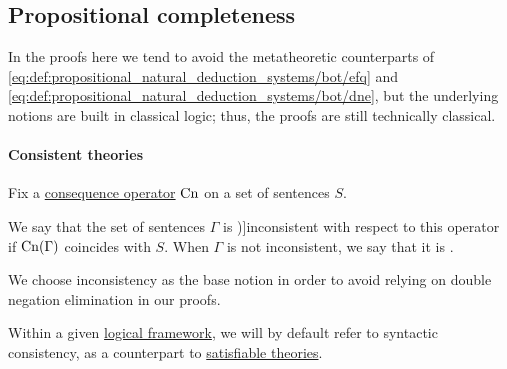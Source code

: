 \subsection{Propositional completeness}\label{subsec:propositional_completeness}

\begin{remark}\label{rem:classical_metatheoretic_proofs}
  In the proofs here we tend to avoid the metatheoretic counterparts of \ref{eq:def:propositional_natural_deduction_systems/bot/efq} and \ref{eq:def:propositional_natural_deduction_systems/bot/dne}, but the underlying notions are built in classical logic; thus, the proofs are still technically classical.
\end{remark}

\paragraph{Consistent theories}

\begin{definition}\label{def:consistent_set_of_sentences}
  Fix a \hyperref[def:consequence_operator]{consequence operator} \( \op{Cn} \) on a set of sentences \( S \).

  We say that the set of sentences \( \Gamma \) is \term[ru=противоречивое (множество формул) (\cite[def. 1.3.15]{Герасимов2011})]{inconsistent} with respect to this operator if \( \op{Cn}(\Gamma) \) coincides with \( S \). When \( \Gamma \) is not inconsistent, we say that it is .
\end{definition}
\begin{comments}
  \item We choose inconsistency as the base notion in order to avoid relying on double negation elimination in our proofs.
  \item Within a given \hyperref[def:logical_framework]{logical framework}, we will by default refer to syntactic consistency, as a counterpart to \hyperref[def:satisfiable_set_of_sentences]{satisfiable theories}.
\end{comments}

